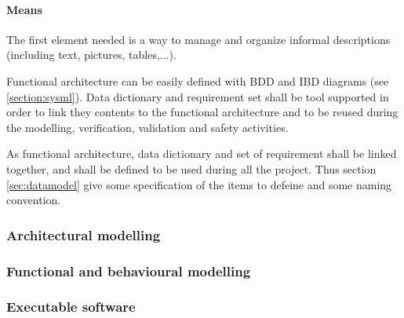 \paragraph{Means}

The first element needed is a way to manage and organize informal descriptions (including text, pictures, tables,...). 

Functional architecture can be easily defined with BDD and IBD diagrams (see \ref{section:sysml}).
Data dictionary  and requirement set shall be tool supported in order to link they contents to the functional architecture and to  be reused during the modelling, verification, validation and safety activities.

As functional architecture, data dictionary and set of requirement shall be linked together, and shall be defined to be used during all the project. Thus section \ref{sec:datamodel} give some specification of the items to defeine and some naming convention.

\subsubsection{Architectural modelling}

\subsubsection{Functional and behavioural modelling}

\subsubsection{Executable software}

